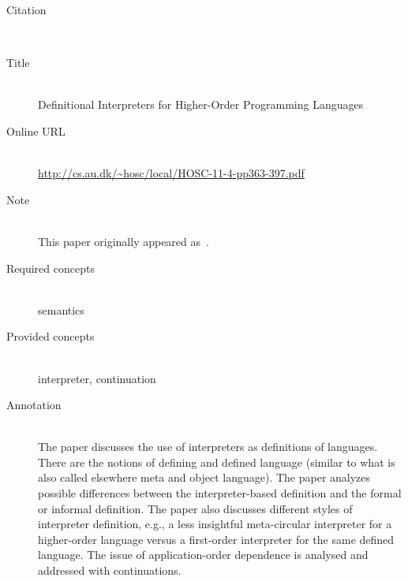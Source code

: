 \begin{description}
\item[Citation]\mbox{}\\
\cite{Reynolds98}
\item[Title]\mbox{}\\
Definitional Interpreters for Higher-Order Programming Languages
\item[Online URL]\mbox{}\\
{\footnotesize\url{http://cs.au.dk/~hosc/local/HOSC-11-4-pp363-397.pdf}}
\item[Note]\mbox{}\\
This paper originally appeared as~\cite{Reynolds72}.
\item[Required concepts]\mbox{}\\
semantics\item[Provided concepts]\mbox{}\\
interpreter, continuation\item[Annotation]\mbox{}\\
The paper discusses the use of interpreters as definitions of languages. There are the notions of defining and defined language (similar to what is also called elsewhere meta and object language). The paper analyzes possible differences between the interpreter-based definition and the formal or informal definition. The paper also discusses different styles of interpreter definition, e.g., a less insightful meta-circular interpreter for a higher-order language versus a first-order interpreter for the same defined language. The issue of application-order dependence is analysed and addressed with continuations.
\end{description}


